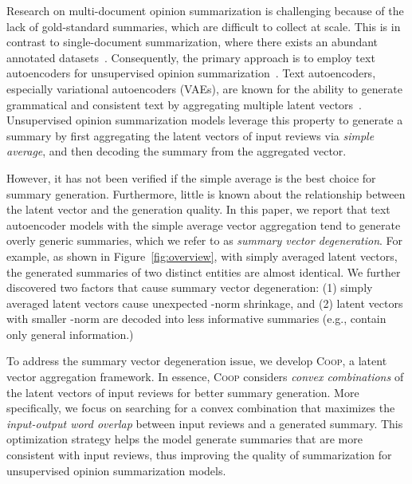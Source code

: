 \documentclass[11pt]{article}
\newcommand{\aggname}{\textsc{Coop}}
\newcommand{\hl}[1]{#1}
\begin{document}
Research on multi-document opinion summarization is challenging because of the lack of gold-standard summaries, which are difficult to collect at scale. This is in contrast to single-document summarization, where there exists an abundant annotated datasets~\cite{usnews,hermann2015teaching,rush-etal-2015-neural,narayan-etal-2018-dont}.
Consequently, the primary approach is to employ text autoencoders for unsupervised opinion summarization~\cite{Chu:2019:MeanSum,brazinskas-etal-2020-unsupervised}.
Text autoencoders, especially variational autoencoders (VAEs), are known for the ability to generate \hl{grammatical and consistent text by aggregating} multiple latent vectors~\cite{bowman-etal-2016-generating}.
Unsupervised opinion summarization models leverage this property to generate a summary by first aggregating the latent vectors of input reviews via {\em simple average}, and then decoding the summary from the aggregated vector.

However, it has not been verified if the simple average is the best choice for summary generation. Furthermore, little is known about the relationship between the latent vector and the generation quality. 
In this paper, we report that text autoencoder models with the simple average vector aggregation tend to generate overly generic summaries, which we refer to as {\em summary vector degeneration}. For example, as shown in Figure~\ref{fig:overview}, with simply averaged latent vectors, the generated summaries of two distinct entities are almost identical. 
We further discovered two factors that cause summary vector degeneration: (1) simply averaged latent vectors cause unexpected -norm shrinkage, and (2) latent vectors with smaller -norm are decoded into less informative summaries (e.g., contain only general information.)

To address the summary vector degeneration issue,
we develop \aggname{}, a latent vector aggregation framework.
In essence, \aggname{} considers {\it convex combinations} of the latent vectors of input reviews for better summary generation. More specifically, we focus on searching for a convex combination that maximizes the {\it input-output word overlap} between input reviews and a generated summary. This optimization strategy helps the model generate summaries that are more consistent with input reviews, thus improving the quality of summarization for unsupervised opinion summarization models.
\end{document}
